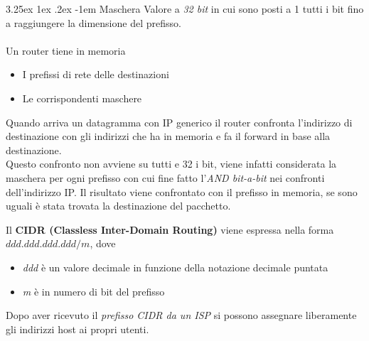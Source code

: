 \documentclass{article}
\makeatletter
\newcounter{subsubsubsection}[subsubsection]
\renewcommand\paragraph{\@startsection{paragraph}{5}{\z@}%
  {3.25ex \@plus1ex \@minus.2ex}%
  {-1em}%
  {\normalfont\normalsize\bfseries}}
\makeatother
\begin{document}
                    \paragraph{Maschera}
                        Valore a \textit{32 bit} in cui sono posti a 1 tutti i bit fino a raggiungere la dimensione del prefisso.\\
                    \\
                    Un router tiene in memoria
                    \begin{itemize}
                        \item I prefissi di rete delle destinazioni
                        \item Le corrispondenti maschere
                    \end{itemize}
                    Quando arriva un datagramma con IP generico il router confronta l'indirizzo di destinazione con gli indirizzi che ha in memoria e fa il forward in base alla destinazione.\\
                    Questo confronto non avviene su tutti e 32 i bit, viene infatti considerata la maschera per ogni prefisso con cui fine fatto l'\textit{AND bit-a-bit} nei confronti dell'indirizzo IP. Il risultato viene confrontato con il prefisso in memoria, se sono uguali è stata trovata la destinazione del pacchetto.

                    Il \textbf{CIDR (Classless Inter-Domain Routing)} viene espressa nella forma $ ddd.ddd.ddd.ddd/m $, dove
                    \begin{itemize}
                        \item \textit{ddd} è un valore decimale in funzione della notazione decimale puntata
                        \item \textit{m} è in numero di bit del prefisso
                    \end{itemize}
                    Dopo aver ricevuto il \textit{prefisso CIDR da un ISP} si possono assegnare liberamente gli indirizzi host ai propri utenti.
\end{document}
